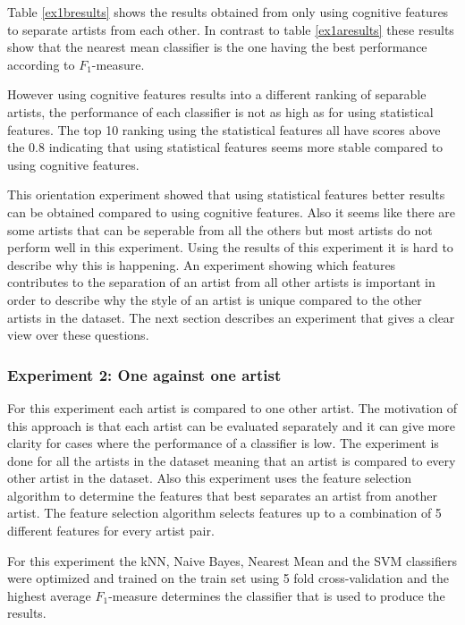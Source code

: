 Table \ref{ex1bresults} shows the results obtained from only using cognitive features to separate artists from each other.
In contrast to table \ref{ex1aresults} these results show that the nearest mean classifier is the one having the best performance according to $F_1$-measure.

However using cognitive features results into a different ranking of separable artists, the performance of each classifier is not as high as for using statistical features.
The top 10 ranking using the statistical features all have scores above the 0.8 indicating that using statistical features seems more stable compared to using cognitive features.

This orientation experiment showed that using statistical features better results can be obtained compared to using cognitive features.
Also it seems like there are some artists that can be seperable from all the others but most artists do not perform well in this experiment.
Using the results of this experiment it is hard to describe why this is happening. 
An experiment showing which features contributes to the separation of an artist from all other artists is important in order to describe why the style of an artist is unique compared to the other artists in the dataset.
The next section describes an experiment that gives a clear view over these questions.

\subsubsection{Experiment 2: One against one artist}

For this experiment each artist is compared to one other artist.
The motivation of this approach is that each artist can be evaluated separately and it can give more clarity for cases where the performance of a classifier is low.
The experiment is done for all the artists in the dataset meaning that an artist is compared to every other artist in the dataset.
Also this experiment uses the feature selection algorithm to determine the features that best separates an artist from another artist.
The feature selection algorithm selects features up to a combination of 5 different features for every artist pair.

For this experiment the kNN, Naive Bayes, Nearest Mean and the SVM classifiers were optimized and trained on the train set using 5 fold cross-validation and the highest average $F_1$-measure determines the classifier that is used to produce the results.


